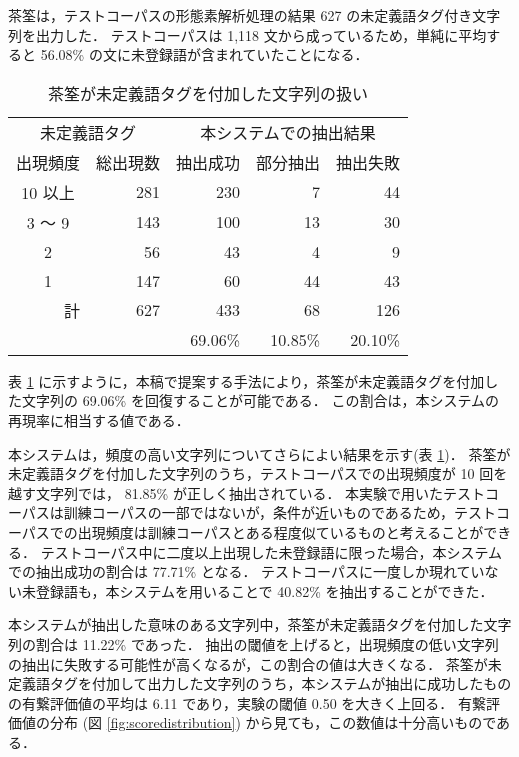 茶筌は，テストコーパスの形態素解析処理の結果 627 の未定義語タグ付き文字列を出力した．
テストコーパスは 1,118 文から成っているため，単純に平均すると 56.08\% の文に未登録語が含まれていたことになる．
\begin{table}[hbt]
\begin{minipage}{\textwidth}
\begin{center}
\caption{茶筌が未定義語タグを付加した文字列の扱い}
\label{tab:unk}
\begin{tabular}{crrrr}
\hline
\hline
\multicolumn{2}{c}{未定義語タグ}& \multicolumn{3}{c}{本システムでの抽出結果} \\
出現頻度 & 総出現数  & 抽出成功 & 部分抽出 & 抽出失敗 \\
\hline
 10 以上  & 281 &     230    &     7  &      44    \\   
 3 〜 9   & 143 &     100    &    13  &      30    \\
   2      &  56 &      43    &     4  &       9    \\
   1      & 147 &      60    &    44  &      43    \\
\hline
\multicolumn{1}{r}{計} & 627 &     433    &    68  &     126    \\
          &     &   69.06\%  & 10.85\%&   20.10\%  \\
\hline
\hline
\end{tabular}
\end{center}
\end{minipage}
\end{table}
表 \ref{tab:unk} に示すように，本稿で提案する手法により，茶筌が未定義語タグを付加した文字列の 69.06\% を回復することが可能である．
この割合は，本システムの再現率に相当する値である．

本システムは，頻度の高い文字列についてさらによい結果を示す(表 \ref{tab:unk})．
茶筌が未定義語タグを付加した文字列のうち，テストコーパスでの出現頻度が 10 回を越す文字列では， 81.85\% が正しく抽出されている．
本実験で用いたテストコーパスは訓練コーパスの一部ではないが，条件が近いものであるため，テストコーパスでの出現頻度は訓練コーパスとある程度似ているものと考えることができる．
テストコーパス中に二度以上出現した未登録語に限った場合，本システムでの抽出成功の割合は 77.71\% となる．
テストコーパスに一度しか現れていない未登録語も，本システムを用いることで 40.82\% を抽出することができた．

本システムが抽出した意味のある文字列中，茶筌が未定義語タグを付加した文字列の割合は 11.22\% であった．
抽出の閾値を上げると，出現頻度の低い文字列の抽出に失敗する可能性が高くなるが，この割合の値は大きくなる．
茶筌が未定義語タグを付加して出力した文字列のうち，本システムが抽出に成功したものの有繋評価値の平均は 6.11 であり，実験の閾値 0.50 を大きく上回る．
有繋評価値の分布 (図 \ref{fig:scoredistribution}) から見ても，この数値は十分高いものである．

